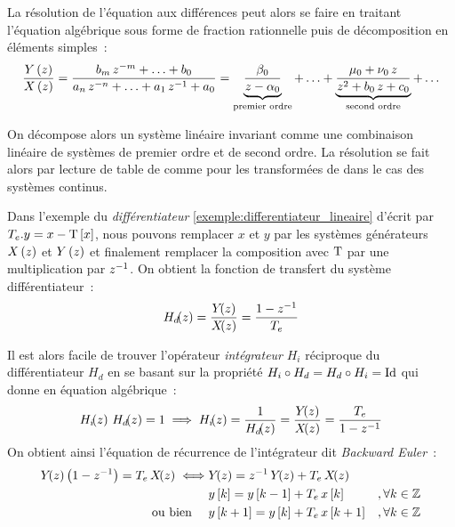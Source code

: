 La résolution de l'équation aux différences peut alors se faire en
traitant l'équation algébrique sous forme de fraction rationnelle puis
de décomposition en éléments simples~:
\begin{eqnarray}
  \label{eq:systeme_algebrique}
 \frac{Y\left(z\right)}{X\left(z\right)} = \frac{b_m\,z^{-m} + \ldots + b_0}{a_n\,z^{-n}+ \ldots +  a_1\,z^{-1} + a_0} = \underbrace{\frac{\beta_0}{z-\alpha_0}}_{\text{premier ordre}} + \ldots + \underbrace{\frac{\mu_0+\nu_0\,z}{z^2+b_0\,z+c_0}}_{\text{second ordre}} + \ldots
\end{eqnarray}

On décompose alors un système linéaire invariant comme une combinaison
linéaire de systèmes de premier ordre et de second ordre. La
résolution se fait alors par lecture de table de \teZ{} comme pour les
transformées de \Laplace{} dans le cas des systèmes continus.

\begin{exemple}
  \label{exemple:forward_euler}
  Dans l'exemple du \emph{différentiateur}
  \ref{exemple:differentiateur_lineaire} d'écrit par
  $T_e.y = x - \mathrm{T}\left[x\right]$, nous pouvons remplacer $x$ et $y$ par les
  systèmes générateurs $X\left(z\right)$ et $Y\left(z\right)$ et finalement remplacer la
  composition avec $\mathrm{T}$ par une multiplication par $z^{-1}$. On
  obtient la fonction de transfert du système différentiateur~:
  $$H_d\!\!\left(z\right)=\frac{Y\!\!\left(z\right)}{X\!\!\left(z\right)}= \frac{1-z^{-1}}{T_e}$$

  Il est alors facile de trouver l'opérateur \emph{intégrateur} $H_i$
  réciproque du différentiateur $H_d$ en se basant sur la propriété
  $H_i\circ H_d = H_d \circ H_i = \mathrm{Id}$ qui donne en équation
  algébrique~:
  $$
  H_i\de{z}\,H_d\de{z}=1 \implies H_i\de{z} = \frac{1}{H_d\de{z}} = \frac{Y\de{z}}{X\de{z}}=\frac{T_e}{1-\zmu}
  $$
  On obtient ainsi l'équation de récurrence de l'intégrateur dit \emph{Backward Euler}~:
  \begin{align}
    \label{eq:forward_euler}
    Y\de{z}\p{1-\zmu}=T_e\, X\de{z}  \iff & Y\de{z}=\zmu\,Y\de{z} + T_e\, X\de{z}&\nonumber\\
                                          &  y\b{k} = y\b{k-1} + T_e\, x\b{k} &, \forall k\in\Z \\
    \text{ou bien }   \quad                     &  y\b{k+1} = y\b{k} + T_e\, x\b{k+1} &, \forall k\in\Z \nonumber
  \end{align}
\end{exemple}

